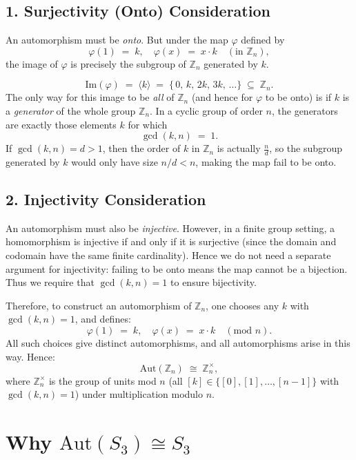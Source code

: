 \documentclass[12pt]{article}
\theoremstyle{definition} %
\theoremstyle{plain} %
\begin{document}
\subsection*{1. Surjectivity (Onto) Consideration}

An automorphism must be \emph{onto}. But under the map $\varphi$ defined by
\[
  \varphi(1) \;=\; k,\quad
  \varphi(x) \;=\; x \cdot k \quad(\text{in }\mathbb{Z}_n),
\]
the image of $\varphi$ is precisely the subgroup of $\mathbb{Z}_n$ generated by $k$. 

\[
  \mathrm{Im}(\varphi)
  \;=\;
  \langle k \rangle
  \;=\;
  \{\, 0,\,k,\,2k,\,3k,\,\dots \} \;\subseteq\; \mathbb{Z}_n.
\]
The only way for this image to be \emph{all} of $\mathbb{Z}_n$ (and hence for $\varphi$ to be onto)
is if $k$ is a \emph{generator} of the whole group $\mathbb{Z}_n$. In a cyclic group of order $n$,
the generators are exactly those elements $k$ for which 
\[
  \gcd(k,n) \;=\; 1.
\]
If $\gcd(k,n) = d > 1$, then the order of $k$ in $\mathbb{Z}_n$ is actually $\frac{n}{d}$, so the
subgroup generated by $k$ would only have size $n/d < n$, making the map fail to be onto.

\subsection*{2. Injectivity Consideration}

An automorphism must also be \emph{injective}. However, in a finite group setting, a homomorphism
is injective if and only if it is surjective (since the domain and codomain have the same finite
cardinality). Hence we do not need a separate argument for injectivity: failing to be onto means 
the map cannot be a bijection. 
Thus we require that $\gcd(k,n) = 1$ to ensure bijectivity.

\bigskip

\noindent
Therefore, to construct an automorphism of $\mathbb{Z}_n$, one chooses any $k$ with 
\(\gcd(k,n) = 1\), and defines:
\[
  \varphi(1) \;=\; k, \quad
  \varphi(x) \;=\; x \cdot k \quad (\text{mod }n).
\]
All such choices give distinct automorphisms, and all automorphisms arise in this way. Hence:
\[
  \mathrm{Aut}(\mathbb{Z}_n) \;\cong\; \mathbb{Z}_n^\times,
\]
where $\mathbb{Z}_n^\times$ is the group of units mod $n$ (all $[k] \in \{[0],[1],\dots,[n-1]\}$ 
with $\gcd(k,n) = 1$) under multiplication modulo $n$.

\section*{Why \texorpdfstring{$\mathrm{Aut}(S_3) \cong S_3$}{Aut(S3) is isomorphic to S3}}
\end{document}
